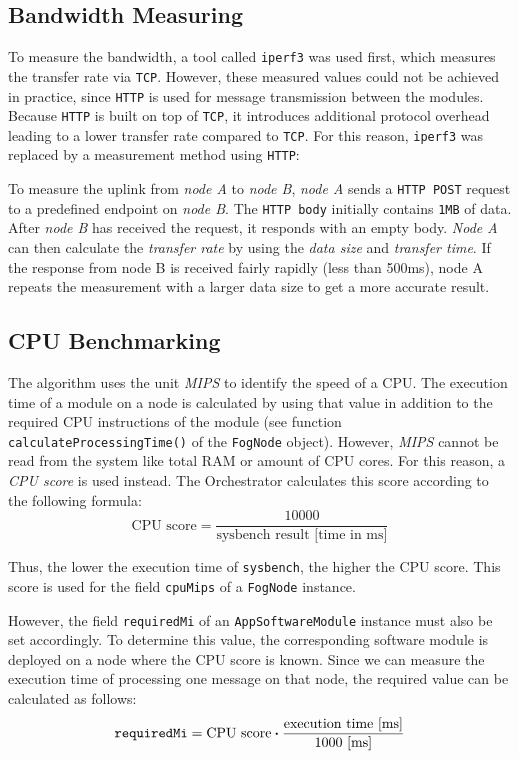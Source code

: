 \subsection{Bandwidth Measuring\label{sec:measuring-bandwidth}}
To measure the bandwidth, a tool called \texttt{iperf3} was used first, which measures the transfer rate via \texttt{TCP}.
However, these measured values could not be achieved in practice, since \texttt{HTTP} is used for message transmission between the modules.
Because \texttt{HTTP} is built on top of \texttt{TCP}, it introduces additional protocol overhead leading to a lower transfer rate compared to \texttt{TCP}.
For this reason, \texttt{iperf3} was replaced by a measurement method using \texttt{HTTP}:

To measure the uplink from \textit{node A} to \textit{node B}, \textit{node A} sends a \texttt{HTTP POST} request to a predefined endpoint on \textit{node B}. The \texttt{HTTP body} initially contains \texttt{1MB} of data. After \textit{node B} has received the request, it responds with an empty body. \textit{Node A} can then calculate the \textit{transfer rate} by using the \textit{data size} and \textit{transfer time}.
If the response from node B is received fairly rapidly (less than 500ms), node A repeats the measurement with a larger data size to get a more accurate result.

\subsection{CPU Benchmarking\label{sec:benchmark-cpu}}
The algorithm uses the unit \textit{MIPS} to identify the speed of a CPU.
The execution time of a module on a node is calculated by using that value in addition to the required CPU instructions of the module (see function \texttt{calculateProcessingTime()} of the \texttt{FogNode} object).
However, \textit{MIPS} cannot be read from the system like total RAM or amount of CPU cores.
For this reason, a \textit{CPU score} is used instead. The Orchestrator calculates this score according to the following formula:
\[\textrm{CPU score} = \frac{10000}{\textrm{sysbench result [time in ms]}}\]

Thus, the lower the execution time of \texttt{sysbench}, the higher the CPU score. This score is used for the field \texttt{cpuMips} of a \texttt{FogNode} instance.

However, the field \texttt{requiredMi} of an \texttt{AppSoftwareModule} instance must also be set accordingly. To determine this value, the corresponding software module is deployed on a node where the CPU score is known. Since we can measure the execution time of processing one message on that node, the required value can be calculated as follows:
\[\textrm{\texttt{requiredMi}} = \textrm{CPU score} \boldsymbol{\cdot} \frac{\textrm{execution time [ms]}}{1000 \textrm{ [ms]}}\]


